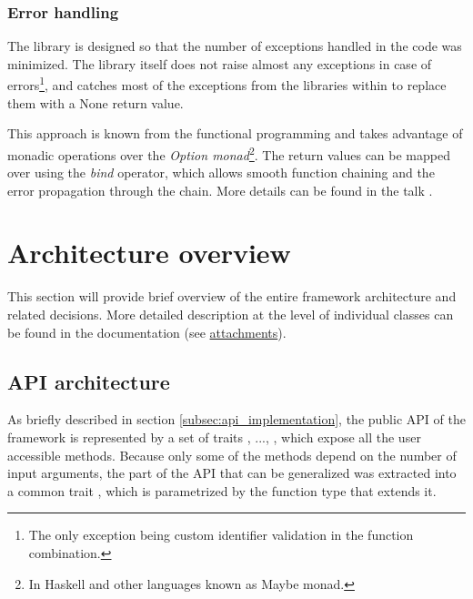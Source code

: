 \subsubsection{Error handling}

The library is designed so that the number of exceptions handled in the code was minimized. The library itself does not raise almost any exceptions in case of errors\footnote{The only exception being custom identifier validation in the function combination.}, and catches most of the exceptions from the libraries within to replace them with a None return value.

This approach is known from the functional programming and takes advantage of monadic operations over the \textit{Option monad}\footnote{In Haskell and other languages known as Maybe monad.}. The return values can be mapped over using the \textit{bind} operator, which allows smooth function chaining and the error propagation through the chain. More details can be found in the talk \cite{noauthor_railway_nodate}.

\section{Architecture overview}
\label{sec:architecture_overview}

This section will provide brief overview of the entire framework architecture and related decisions. More detailed description at the level of individual classes can be found in the documentation (see  \hyperref[attach:scaladoc]{attachments}).

\subsection{API architecture}
\label{subsec:api_architecture}

As briefly described in section \ref{subsec:api_implementation}, the public API of the framework is represented by a set of traits , ..., , which expose all the user accessible methods. Because only some of the methods depend on the number of input arguments, the part of the API that can be generalized was extracted into a common trait , which is parametrized by the function type that extends it. 

